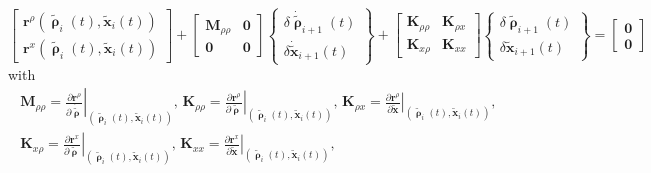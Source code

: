 \documentclass[review]{elsarticle}
\numberwithin{equation}{section}
\begin{document}
\begin{equation}
	\left[
		\begin{array}{c}
			\mathbf{r}^\rho(\tilde{\pmb\uprho}_i(t), \tilde{\mathbf{x}}_i(t))\\
			\mathbf{r}^x(\tilde{\pmb\uprho}_i(t), \tilde{\mathbf{x}}_i(t))
		\end{array}
	\right]
	+
	\left[
	\begin{array}{cc}
		\mathbf{M}_{\rho\rho} & \mathbf{0}\\
		\mathbf{0} & \mathbf{0}
	\end{array}
	\right]
	\left\{
		\begin{array}{c}
		\delta\dot{\tilde{\pmb\uprho}}_{i+1}(t)\\
		\delta\dot{\tilde{\mathbf{x}}}_{i+1}(t)
		\end{array}
	\right\}
	+
	\left[
		\begin{array}{cc}
			\mathbf{K}_{\rho\rho} & \mathbf{K}_{\rho x}\\
			\mathbf{K}_{x\rho} & \mathbf{K}_{xx}
		\end{array}
		\right]
		\left\{
			\begin{array}{c}
			\delta\tilde{\pmb\uprho}_{i+1}(t)\\
			\delta\tilde{\mathbf{x}}_{i+1}(t)
			\end{array}
		\right\}
		=
		\left[
			\begin{array}{c}
				\mathbf{0}\\
				\mathbf{0}
			\end{array}
		\right]
		\label{eq:tangent_remodelling}
\end{equation}
with
\begin{equation}
\begin{split}
\mathbf{M}_{\rho\rho} = 
\left.
\frac{\partial \mathbf{r}^\rho}{\partial \dot{\tilde{\pmb\uprho}}}
\right|_{(\tilde{\pmb\uprho}_i(t),\tilde{\mathbf{x}}_i(t))},\,
\mathbf{K}_{\rho\rho} = 
\left.
\frac{\partial \mathbf{r}^\rho}{\partial {\tilde{\pmb\uprho}}}
\right|_{(\tilde{\pmb\uprho}_i(t),\tilde{\mathbf{x}}_i(t))},\,
\mathbf{K}_{\rho x} = 
\left.
\frac{\partial \mathbf{r}^\rho}{\partial {\tilde{\mathbf{x}}}}
\right|_{(\tilde{\pmb\uprho}_i(t),\tilde{\mathbf{x}}_i(t))},\,\\
\mathbf{K}_{x \rho} = 
\left.
\frac{\partial \mathbf{r}^x}{\partial {\tilde{\pmb\uprho}}}
\right|_{(\tilde{\pmb\uprho}_i(t),\tilde{\mathbf{x}}_i(t))},\,
\mathbf{K}_{x x} = 
\left.
\frac{\partial \mathbf{r}^x}{\partial {\tilde{\mathbf{x}}}}
\right|_{(\tilde{\pmb\uprho}_i(t),\tilde{\mathbf{x}}_i(t))},
\end{split}
\end{equation}
\end{document}
